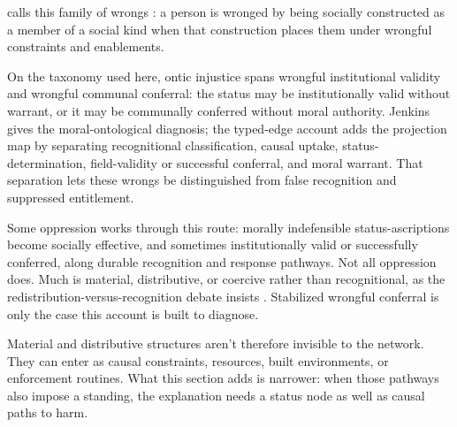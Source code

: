 \documentclass[12pt]{article}
\begin{document}
\textcite{jenkins2020OnticInjustice,jenkins2023OntologyOppression} calls this family of wrongs : a person is wronged by being socially constructed as a member of a social kind when that construction places them under wrongful constraints and enablements.

On the taxonomy used here, ontic injustice spans wrongful institutional validity and wrongful communal conferral: the status may be institutionally valid without warrant, or it may be communally conferred without moral authority. Jenkins gives the moral-ontological diagnosis; the typed-edge account adds the projection map by separating recognitional classification, causal uptake, status-determination, field-validity or successful conferral, and moral warrant. That separation lets these wrongs be distinguished from false recognition and suppressed entitlement.

Some oppression works through this route: morally indefensible status-ascriptions become socially effective, and sometimes institutionally valid or successfully conferred, along durable recognition and response pathways. Not all oppression does. Much is material, distributive, or coercive rather than recognitional, as the redistribution-versus-recognition debate insists \citep{fraserHonneth2003Redistribution}. Stabilized wrongful conferral is only the case this account is built to diagnose.

Material and distributive structures aren't therefore invisible to the network. They can enter as causal constraints, resources, built environments, or enforcement routines. What this section adds is narrower: when those pathways also impose a standing, the explanation needs a status node as well as causal paths to harm.
\end{document}
